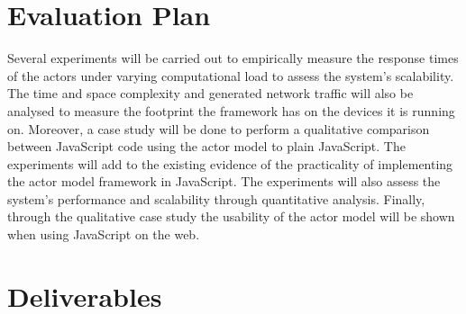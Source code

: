 \documentclass[12pt]{report}
\begin{document}
\section{Evaluation Plan}
Several experiments will be carried out to empirically measure the response times of the actors under varying computational load to assess the system’s scalability. The time and space complexity and generated network traffic will also be analysed to measure the footprint the framework has on the devices it is running on. Moreover, a case study will be done to perform a qualitative comparison between JavaScript code using the actor model to plain JavaScript. The experiments will add to the existing evidence of the practicality of implementing the actor model framework in JavaScript. The experiments will also assess the system's performance and scalability through quantitative analysis. Finally, through the qualitative case study the usability of the actor model will be shown when using JavaScript on the web.
\section{Deliverables}

  
\end{document}
